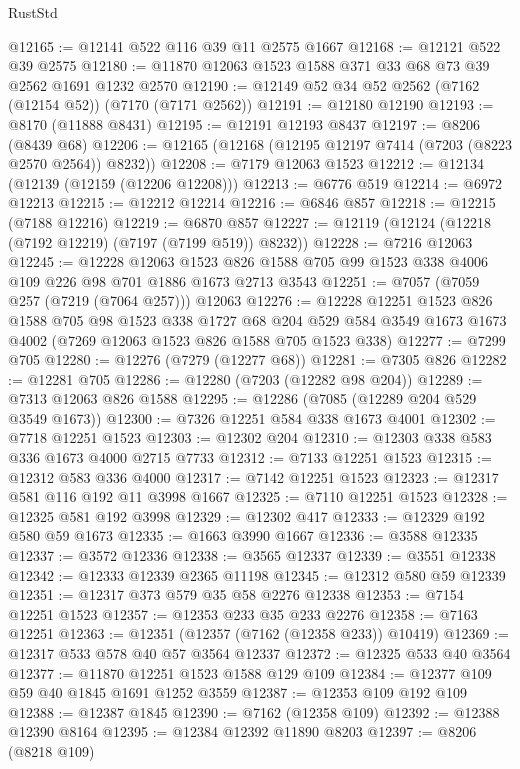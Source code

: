 \begin{lexlean}{RustStd}
\begin{coremodule}
@12165 := @12141 @522 @116 @39 @11 @2575 @1667
@12168 := @12121 @522 @39 @2575
@12180 := @11870 @12063 @1523 @1588 @371 @33 @68 @73 @39 @2562 @1691 @1232 @2570
@12190 := @12149 @52 @34 @52 @2562 (@7162 (@12154 @52)) (@7170 (@7171 @2562))
@12191 := @12180 @12190
@12193 := @8170 (@11888 @8431)
@12195 := @12191 @12193 @8437
@12197 := @8206 (@8439 @68)
@12206 := @12165 (@12168 (@12195 @12197 @7414 (@7203 (@8223 @2570 @2564)) @8232))
@12208 := @7179 @12063 @1523
@12212 := @12134 (@12139 (@12159 (@12206 @12208)))
@12213 := @6776 @519
@12214 := @6972 @12213
@12215 := @12212 @12214
@12216 := @6846 @857
@12218 := @12215 (@7188 @12216)
@12219 := @6870 @857
@12227 := @12119 (@12124 (@12218 (@7192 @12219) (@7197 (@7199 @519)) @8232))
@12228 := @7216 @12063
@12245 := @12228
    @12063
    @1523
    @826
    @1588
    @705
    @99
    @1523
    @338
    @4006
    @109
    @226
    @98
    @701
    @1886
    @1673
    @2713
    @3543
@12251 := @7057 (@7059 @257 (@7219 (@7064 @257))) @12063
@12276 := @12228
    @12251
    @1523
    @826
    @1588
    @705
    @98
    @1523
    @338
    @1727
    @68
    @204
    @529
    @584
    @3549
    @1673
    @1673
    @4002
    (@7269 @12063 @1523 @826 @1588 @705 @1523 @338)
@12277 := @7299 @705
@12280 := @12276 (@7279 (@12277 @68))
@12281 := @7305 @826
@12282 := @12281 @705
@12286 := @12280 (@7203 (@12282 @98 @204))
@12289 := @7313 @12063 @826 @1588
@12295 := @12286 (@7085 (@12289 @204 @529 @3549 @1673))
@12300 := @7326 @12251 @584 @338 @1673 @4001
@12302 := @7718 @12251 @1523
@12303 := @12302 @204
@12310 := @12303 @338 @583 @336 @1673 @4000 @2715 @7733
@12312 := @7133 @12251 @1523
@12315 := @12312 @583 @336 @4000
@12317 := @7142 @12251 @1523
@12323 := @12317 @581 @116 @192 @11 @3998 @1667
@12325 := @7110 @12251 @1523
@12328 := @12325 @581 @192 @3998
@12329 := @12302 @417
@12333 := @12329 @192 @580 @59 @1673
@12335 := @1663 @3990 @1667
@12336 := @3588 @12335
@12337 := @3572 @12336
@12338 := @3565 @12337
@12339 := @3551 @12338
@12342 := @12333 @12339 @2365 @11198
@12345 := @12312 @580 @59 @12339
@12351 := @12317 @373 @579 @35 @58 @2276 @12338
@12353 := @7154 @12251 @1523
@12357 := @12353 @233 @35 @233 @2276
@12358 := @7163 @12251
@12363 := @12351 (@12357 (@7162 (@12358 @233)) @10419)
@12369 := @12317 @533 @578 @40 @57 @3564 @12337
@12372 := @12325 @533 @40 @3564
@12377 := @11870 @12251 @1523 @1588 @129 @109
@12384 := @12377 @109 @59 @40 @1845 @1691 @1252 @3559
@12387 := @12353 @109 @192 @109
@12388 := @12387 @1845
@12390 := @7162 (@12358 @109)
@12392 := @12388 @12390 @8164
@12395 := @12384 @12392 @11890 @8203
@12397 := @8206 (@8218 @109)

\end{coremodule}
\end{lexlean}
